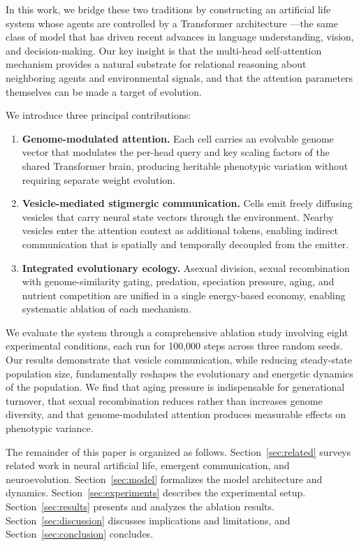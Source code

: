 \documentclass[10pt,twocolumn]{article}
\begin{document}
In this work, we bridge these two traditions by constructing an artificial life system whose agents are controlled by a Transformer architecture \cite{vaswani2017attention}---the same class of model that has driven recent advances in language understanding, vision, and decision-making.
Our key insight is that the multi-head self-attention mechanism provides a natural substrate for relational reasoning about neighboring agents and environmental signals, and that the attention parameters themselves can be made a target of evolution.

We introduce three principal contributions:

\begin{enumerate}
\item \textbf{Genome-modulated attention.} Each cell carries an evolvable genome vector that modulates the per-head query and key scaling factors of the shared Transformer brain, producing heritable phenotypic variation without requiring separate weight evolution.

\item \textbf{Vesicle-mediated stigmergic communication.} Cells emit freely diffusing vesicles that carry neural state vectors through the environment. Nearby vesicles enter the attention context as additional tokens, enabling indirect communication that is spatially and temporally decoupled from the emitter.

\item \textbf{Integrated evolutionary ecology.} Asexual division, sexual recombination with genome-similarity gating, predation, speciation pressure, aging, and nutrient competition are unified in a single energy-based economy, enabling systematic ablation of each mechanism.
\end{enumerate}

We evaluate the system through a comprehensive ablation study involving eight experimental conditions, each run for 100{,}000 steps across three random seeds. Our results demonstrate that vesicle communication, while reducing steady-state population size, fundamentally reshapes the evolutionary and energetic dynamics of the population. We find that aging pressure is indispensable for generational turnover, that sexual recombination reduces rather than increases genome diversity, and that genome-modulated attention produces measurable effects on phenotypic variance.

The remainder of this paper is organized as follows. Section~\ref{sec:related} surveys related work in neural artificial life, emergent communication, and neuroevolution. Section~\ref{sec:model} formalizes the model architecture and dynamics. Section~\ref{sec:experiments} describes the experimental setup. Section~\ref{sec:results} presents and analyzes the ablation results. Section~\ref{sec:discussion} discusses implications and limitations, and Section~\ref{sec:conclusion} concludes.
\end{document}
